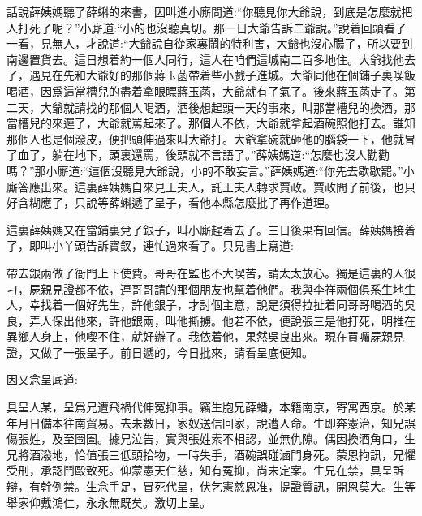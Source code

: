


\begin{parag}
    話說薛姨媽聽了薛蝌的來書，因叫進小廝問道:“你聽見你大爺說，到底是怎麼就把人打死了呢？”小廝道:“小的也沒聽真切。那一日大爺告訴二爺說。”說着回頭看了一看，見無人，才說道:“大爺說自從家裏鬧的特利害，大爺也沒心腸了，所以要到南邊置貨去。這日想着約一個人同行，這人在咱們這城南二百多地住。大爺找他去了，遇見在先和大爺好的那個蔣玉菡帶着些小戲子進城。大爺同他在個鋪子裏喫飯喝酒，因爲這當槽兒的盡着拿眼瞟蔣玉菡，大爺就有了氣了。後來蔣玉菡走了。第二天，大爺就請找的那個人喝酒，酒後想起頭一天的事來，叫那當槽兒的換酒，那當槽兒的來遲了，大爺就罵起來了。那個人不依，大爺就拿起酒碗照他打去。誰知那個人也是個潑皮，便把頭伸過來叫大爺打。大爺拿碗就砸他的腦袋一下，他就冒了血了，躺在地下，頭裏還罵，後頭就不言語了。”薛姨媽道:“怎麼也沒人勸勸嗎？”那小廝道:“這個沒聽見大爺說，小的不敢妄言。”薛姨媽道:“你先去歇歇罷。”小廝答應出來。這裏薛姨媽自來見王夫人，託王夫人轉求賈政。賈政問了前後，也只好含糊應了，只說等薛蝌遞了呈子，看他本縣怎麼批了再作道理。
\end{parag}


\begin{parag}
    這裏薛姨媽又在當鋪裏兌了銀子，叫小廝趕着去了。三日後果有回信。薛姨媽接着了，即叫小丫頭告訴寶釵，連忙過來看了。只見書上寫道:
\end{parag}


\begin{parag}
    帶去銀兩做了衙門上下使費。哥哥在監也不大喫苦，請太太放心。獨是這裏的人很刁，屍親見證都不依，連哥哥請的那個朋友也幫着他們。我與李祥兩個俱系生地生人，幸找着一個好先生，許他銀子，才討個主意，說是須得拉扯着同哥哥喝酒的吳良，弄人保出他來，許他銀兩，叫他撕擄。他若不依，便說張三是他打死，明推在異鄉人身上，他喫不住，就好辦了。我依着他，果然吳良出來。現在買囑屍親見證，又做了一張呈子。前日遞的，今日批來，請看呈底便知。
\end{parag}


\begin{parag}
    因又念呈底道:
\end{parag}


\begin{qute2sp}
    具呈人某，呈爲兄遭飛禍代伸冤抑事。竊生胞兄薛蟠，本籍南京，寄寓西京。於某年月日備本往南貿易。去未數日，家奴送信回家，說遭人命。生即奔憲治，知兄誤傷張姓，及至囹圄。據兄泣告，實與張姓素不相認，並無仇隙。偶因換酒角口，生兄將酒潑地，恰值張三低頭拾物，一時失手，酒碗誤碰滷門身死。蒙恩拘訊，兄懼受刑，承認鬥毆致死。仰蒙憲天仁慈，知有冤抑，尚未定案。生兄在禁，具呈訴辯，有幹例禁。生念手足，冒死代呈，伏乞憲慈恩准，提證質訊，開恩莫大。生等舉家仰戴鴻仁，永永無既矣。激切上呈。
\end{qute2sp}



